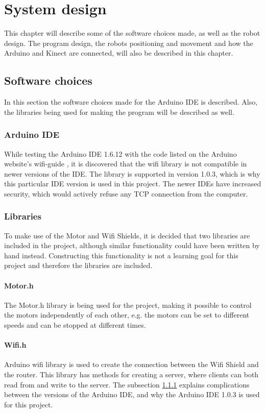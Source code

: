 \chapter{System design}
\label{chap:System design}
This chapter will describe some of the software choices made, as well as the robot design. The program design, the robots positioning and movement and how the Arduino and Kinect are connected, will also be described in this chapter. 


\section{Software choices}
\label{sec:Software choices}
In this section the software choices made for the Arduino IDE is described. Also, the libraries being used for making the program will be described as well. 


\subsection{Arduino IDE}
\label{sec:Arduino IDE}
While testing the Arduino IDE 1.6.12 with the code listed on the Arduino website’s wifi-guide \citep{wg}, it is discovered that the wifi library is not compatible in newer versions of the IDE. The library is supported in version 1.0.3, which is why this particular IDE version is used in this project. The newer IDEs have increased security, which would actively refuse any TCP connection from the computer.


\subsection{Libraries}
\label{sec:Libraries} 
To make use of the Motor and Wifi Shields, it is decided that two libraries are included in the project, although similar functionality could have been written by hand instead. Constructing this functionality is not a learning goal for this project and therefore the libraries are included. 


\subsubsection{Motor.h}
\label{sec:Motor.h}
The Motor.h library is being used for the project, making it possible to control the motors independently of each other, e.g. the motors can be set to different speeds and can be stopped at different times. 


\subsubsection{Wifi.h}
\label{sec:Wifi.h}
Arduino wifi library is used to create the connection between the Wifi Shield and the router. This library has methods for creating a server, where clients can both read from and write to the server. The subsection \ref{sec:Arduino IDE} explains complications between the versions of the Arduino IDE, and why the Arduino IDE 1.0.3 is used for this project.


